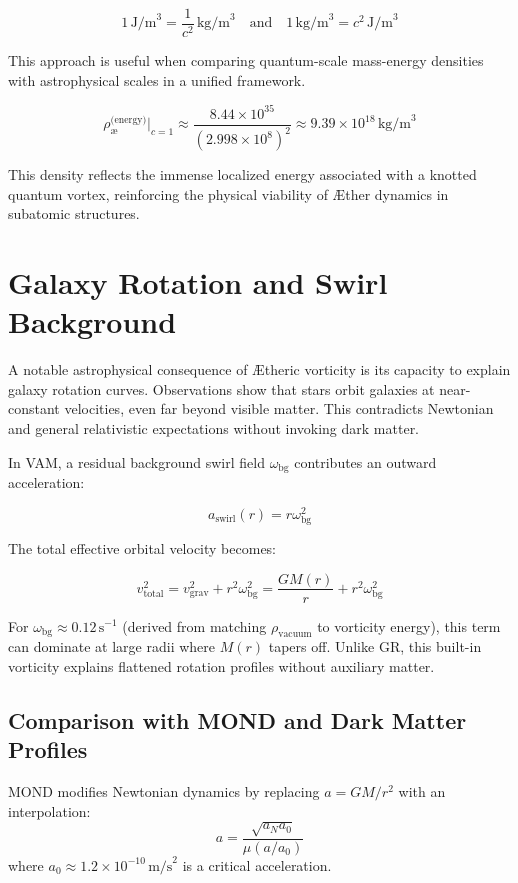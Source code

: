 \documentclass[12pt]{article}
\begin{document}
    \[
        1 \, \text{J/m}^3 = \frac{1}{c^2} \, \text{kg/m}^3 \quad \text{and} \quad 1 \, \text{kg/m}^3 = c^2 \, \text{J/m}^3
    \]


    This approach is useful when comparing quantum-scale mass-energy densities with astrophysical scales in a unified framework.


    \[
        \rho_{\text{\ae}}^{\text{(energy)}} \Big|_{c=1} \approx \frac{8.44 \times 10^{35}}{(2.998 \times 10^8)^2} \approx 9.39 \times 10^{18} \, \text{kg/m}^3
    \]

    This density reflects the immense localized energy associated with a knotted quantum vortex, reinforcing the physical viability of \AE{}ther dynamics in subatomic structures.

    \section{Galaxy Rotation and Swirl Background}

    A notable astrophysical consequence of \AE{}theric vorticity is its capacity to explain galaxy rotation curves. Observations show that stars orbit galaxies at near-constant velocities, even far beyond visible matter. This contradicts Newtonian and general relativistic expectations without invoking dark matter.

    In VAM, a residual background swirl field $\omega_{\text{bg}}$ contributes an outward acceleration:

    \[
        a_{\text{swirl}}(r) = r \omega_{\text{bg}}^2
    \]

    The total effective orbital velocity becomes:

    \[
        v_{\text{total}}^2 = v_{\text{grav}}^2 + r^2 \omega_{\text{bg}}^2 = \frac{G M(r)}{r} + r^2 \omega_{\text{bg}}^2
    \]

    For $\omega_{\text{bg}} \approx 0.12 \, \text{s}^{-1}$ (derived from matching $\rho_{\text{vacuum}}$ to vorticity energy), this term can dominate at large radii where $M(r)$ tapers off. Unlike GR, this built-in vorticity explains flattened rotation profiles without auxiliary matter.

    \subsection{Comparison with MOND and Dark Matter Profiles}

    MOND modifies Newtonian dynamics by replacing $a = GM/r^2$ with an interpolation:
    \[
        a = \frac{\sqrt{a_N a_0}}{\mu(a/a_0)}
    \]
    where $a_0 \approx 1.2 \times 10^{-10} \, \text{m/s}^2$ is a critical acceleration.
\end{document}
